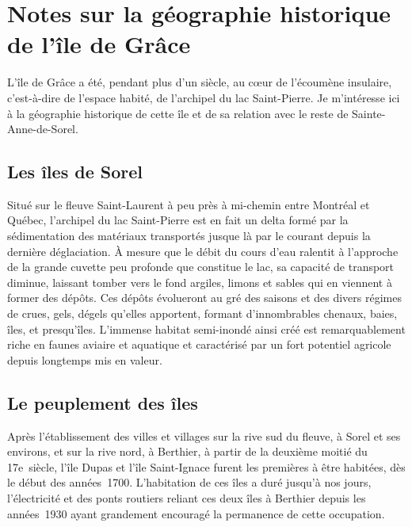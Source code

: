\documentclass[12pt]{report}
\begin{document}
\chapter*{Notes sur la géographie historique de l’île de Grâce}

L’île de Grâce a été, pendant plus d’un siècle, au cœur de l’écoumène insulaire, c’est-à-dire de l’espace habité, de l’archipel du lac Saint-Pierre. Je m’intéresse ici à la géographie historique de cette île et de sa relation avec le reste de Sainte-Anne-de-Sorel.  

\section{Les îles de Sorel}

Situé sur le fleuve Saint-Laurent à peu près à mi-chemin entre Montréal et Québec, l’archipel du lac Saint-Pierre est en fait un delta formé par la sédimentation des matériaux transportés jusque là par le courant depuis la dernière déglaciation. À mesure que le débit du cours d’eau ralentit à l’approche de la grande cuvette peu profonde que constitue le lac, sa capacité de transport diminue, laissant tomber vers le fond argiles, limons et sables qui en viennent à former des dépôts. Ces dépôts évolueront au gré des saisons et des divers régimes de crues, gels, dégels qu’elles apportent, formant d’innombrables chenaux, baies, îles, et presqu’îles. L’immense habitat semi-inondé ainsi créé est remarquablement riche en faunes aviaire et aquatique et caractérisé par un fort potentiel agricole depuis longtemps mis en valeur.  



\section{Le peuplement des îles}

Après l’établissement des villes et villages sur la rive sud du fleuve, à Sorel et ses environs, et sur la rive nord, à Berthier, à partir de la deuxième moitié du 17e siècle, l’île Dupas et l’île Saint-Ignace furent les premières à être habitées, dès le début des années 1700. L’habitation de ces îles a duré jusqu’à nos jours, l’électricité et des ponts routiers reliant ces deux îles à Berthier depuis les années 1930 ayant grandement encouragé la permanence de cette occupation.  
\end{document}
